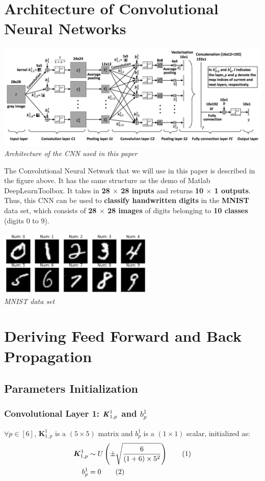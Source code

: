 \documentclass[12pt]{article}
\newcommand\numberthis{\stepcounter{equation}\tag{\theequation}}
\begin{document}
\section{Architecture of Convolutional Neural Networks}
\begin{center}
    \includegraphics[width=\textwidth]{CNN-architecture.png}\\
    \textit{Architecture of the CNN used in this paper}
\end{center}
The Convolutional Neural Network that we will use in this paper is described in the figure above. It has the same structure as the demo of Matlab DeepLearnToolbox. It takes in \textbf{28 $\times$ 28 inputs} and returns \textbf{10 $\times$ 1 outputs}. Thus, this CNN can be used to \textbf{classify handwritten digits} in the \textbf{MNIST} data set, which consists of \textbf{28 $\times$ 28 images} of digits belonging to \textbf{10 classes} (digits $0$ to $9$).
\begin{center}
    \includegraphics[width=280px]{mnist.png}\\
    \textit{MNIST data set}
\end{center}

\section{Deriving Feed Forward and Back Propagation}
\subsection{Parameters Initialization}
\subsubsection{Convolutional Layer 1: $\textbf{\textit{K}}^1_{1,p}$ and $b^1_p$}
$\forall p \in [6]$, $\bm{K}^1_{1,p}$ is a $(5 \times 5)$ matrix and $b^1_p$ is a $(1 \times 1)$ scalar, initialized as:
\begin{align*}
    \bm{K}^1_{1,p} &\sim U\left(\pm \sqrt{\frac{6}{(1 + 6) \times 5^2}}\right)
    \numberthis
    \\
    b^1_p &= 0
    \numberthis
\end{align*}
\end{document}

